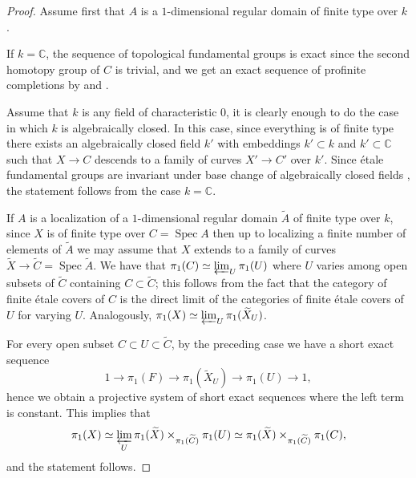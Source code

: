\documentclass[11pt]{amsart}
\theoremstyle{plain}
\theoremstyle{definition}
\newcommand{\on}{\operatorname}
\newcommand{\1}{\mathbb{1}}
\newcommand{\C}{\mathbb{C}}
\newcommand{\spec}{\on{Spec}}
\renewcommand{\projlim}{\varprojlim}
\renewcommand{\tilde}{\widetilde}
\begin{document}
\begin{proof}
    Assume first that $A$ is a $1$-dimensional regular domain of finite type over $k$.

    If $k=\C$, the sequence of topological fundamental groups is exact since the second homotopy group of $C$ is trivial, and we get an exact sequence of profinite completions by \cite[Proposition 5]{anderson} and \cite[Proposition 3.7]{gjz08}.

    Assume that $k$ is any field of characteristic $0$, it is clearly enough to do the case in which $k$ is algebraically closed. In this case, since everything is of finite type there exists an algebraically closed field $k'$ with embeddings $k'\subset k$ and $k'\subset \C$ such that $X\to C$ descends to a family of curves $X'\to C'$ over $k'$. Since étale fundamental groups are invariant under base change of algebraically closed fields \cite[Exposé X, Corollaire 1.8]{sga1}, the statement follows from the case $k=\C$.

    If $A$ is a localization of a $1$-dimensional regular domain $\tilde{A}$ of finite type over $k$, since $X$ is of finite type over $C=\spec A$ then up to localizing a finite number of elements of $\tilde{A}$ we may assume that $X$ extends to a family of curves $\tilde{X}\to\tilde{C}=\spec\tilde{A}$. We have that $\pi_{1}(C)\simeq\projlim_{U}\pi_{1}(U)$ where $U$ varies among open subsets of $\tilde{C}$ containing $C\subset \tilde{C}$; this follows from the fact that the category of finite étale covers of $C$ is the direct limit of the categories of finite étale covers of $U$ for varying $U$. Analogously, $\pi_{1}(X)\simeq\projlim_{U}\pi_{1}(\tilde{X}_{U})$.

    For every open subset $C\subset U\subset \tilde{C}$, by the preceding case we have a short exact sequence
    \[1\to\pi_{1}(F)\to\pi_{1}(\tilde{X}_{U})\to\pi_{1}(U)\to 1,\]
    hence we obtain a projective system of short exact sequences where the left term is constant. This implies that 
    \[\pi_{1}(X)\simeq\projlim_{U}\pi_{1}(\tilde{X})\times_{\pi_{1}(\tilde{C})}\pi_{1}(U)\simeq \pi_{1}(\tilde{X})\times_{\pi_{1}(\tilde{C})}\pi_{1}(C),\]
    and the statement follows.
    


\end{proof}
\end{document}
